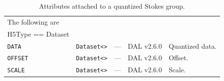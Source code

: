 \documentclass[a4paper,10pt,bibtotoc]{scrartcl}
\begin{document}
\begin{table}[htbp]
\begin{tabular}{|llllp{4.5cm}|}
    \hline 
    \sc The following are & \sc & \sc & \sc   &\\
    \sc H5Type == Dataset & \sc & \sc & \sc   &\\
    \hline 
    \small{\verb|DATA|}  & \verb|Dataset<>| & --- & DAL v2.6.0 & Quantized data. \\ 
    \small{\verb|OFFSET|}  & \verb|Dataset<>| & --- & DAL v2.6.0 & Offset. \\ 
    \small{\verb|SCALE|}  & \verb|Dataset<>| & --- & DAL v2.6.0 & Scale. \\ 
    \hline 
  \end{tabular}
  \caption{Attributes attached to a quantized Stokes group.}
  \label{tab:Qstokes attributes}
\end{table}

\clearpage



\end{document}
